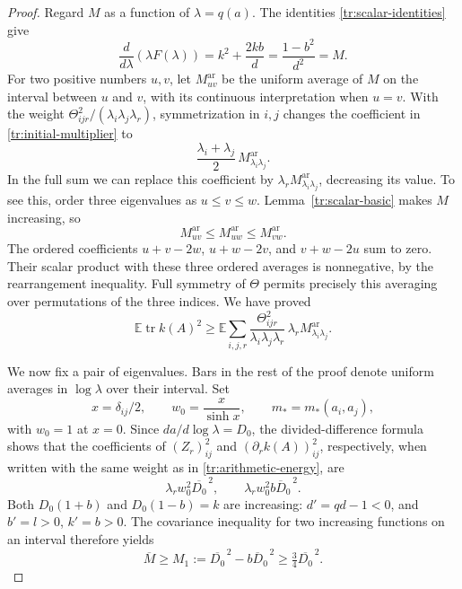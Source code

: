 \begin{proof}
Regard $M$ as a function of $\lambda=q(a)$.  The identities
\eqref{tr:scalar-identities} give
\begin{equation}\label{tr:lambdaF}
 \frac{d}{d\lambda}(\lambda F(\lambda))
 =k^2+\frac{2kb}{d}
 =\frac{1-b^2}{d^2}=M.
\end{equation}
For two positive numbers $u,v$, let $M^{\mathrm{ar}}_{uv}$ be the
uniform average of $M$ on the interval between $u$ and $v$, with its
continuous interpretation when $u=v$.  With the weight
$\Theta_{ijr}^2/(\lambda_i\lambda_j\lambda_r)$, symmetrization in
$i,j$ changes the coefficient in \eqref{tr:initial-multiplier} to
\[
 \frac{\lambda_i+\lambda_j}{2}\,
 M^{\mathrm{ar}}_{\lambda_i\lambda_j}.
\]
In the full sum we can replace this coefficient by
$\lambda_rM^{\mathrm{ar}}_{\lambda_i\lambda_j}$, decreasing its
value.  To see this, order three eigenvalues as $u\le v\le w$.
Lemma~\ref{tr:scalar-basic} makes $M$ increasing, so
\[
 M^{\mathrm{ar}}_{uv}\le M^{\mathrm{ar}}_{uw}
                         \le M^{\mathrm{ar}}_{vw}.
\]
The ordered coefficients $u+v-2w$, $u+w-2v$, and $v+w-2u$ sum to
zero.  Their scalar product with these three ordered averages is
nonnegative, by the rearrangement inequality.  Full symmetry of
$\Theta$ permits precisely this averaging over permutations of the
three indices.  We have proved
\begin{equation}\label{tr:arithmetic-energy}
 \mathbb E\operatorname{tr}k(A)^2
 \ge\mathbb E\sum_{i,j,r}
 \frac{\Theta_{ijr}^2}{\lambda_i\lambda_j\lambda_r}\,
 \lambda_r M^{\mathrm{ar}}_{\lambda_i\lambda_j}.
\end{equation}

We now fix a pair of eigenvalues.  Bars in the rest of the proof denote
uniform averages in $\log\lambda$ over their interval.  Set
\[
 x=\delta_{ij}/2,\qquad w_0=\frac{x}{\sinh x},\qquad m_*=m_*(a_i,a_j),
\]
with $w_0=1$ at $x=0$.  Since $da/d\log\lambda=D_0$,
the divided-difference formula shows that the coefficients of
$(Z_r)_{ij}^2$ and $(\partial_r k(A))_{ij}^2$, respectively, when
written with the same weight as in \eqref{tr:arithmetic-energy}, are
\begin{equation}\label{tr:derivative-coefficients}
 \lambda_r w_0^2\overline{D_0}^{\,2},\qquad
 \lambda_r w_0^2\overline{bD_0}^{\,2}.
\end{equation}
Both $D_0(1+b)$ and $D_0(1-b)=k$ are increasing: $d'=qd-1<0$,
and $b'=l>0$, $k'=b>0$.  The covariance inequality for two increasing
functions on an interval therefore yields
\begin{equation}\label{tr:logarithmic-chebyshev}
 \overline M\ge
 M_1:=\overline{D_0}^{\,2}-\overline{bD_0}^{\,2}
 \ge\tfrac34\overline{D_0}^{\,2}.
\end{equation}


\end{proof}
